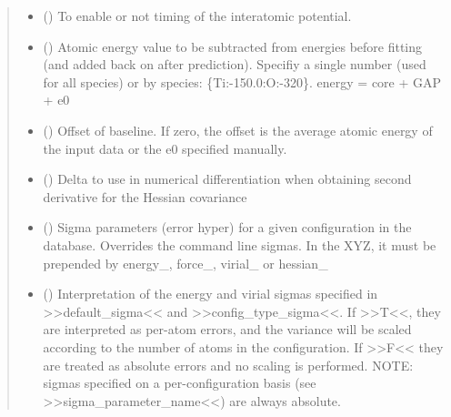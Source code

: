 \documentclass[letterpaper,10pt,english]{sphinxmanual}
\begin{document}
\begin{fulllineitems}
\begin{quote}
\begin{description}
\begin{itemize}
\item {} 
 () \textendash{} To enable or not timing of the interatomic potential.

\item {} 
 () \textendash{} Atomic energy value to be subtracted from energies before fitting (and added back on after
prediction). Specifiy a single number (used for all species) or by species: \{Ti:-150.0:O:-320\}.
energy = core + GAP + e0

\item {} 
 () \textendash{} Offset of baseline. If zero, the offset is the average atomic energy of the input data or
the e0 specified manually.

\item {} 
 () \textendash{} Delta to use in numerical differentiation when obtaining second derivative for the
Hessian covariance

\item {} 
 () \textendash{} Sigma parameters (error hyper) for a given configuration in the database. Overrides
the command line sigmas. In the XYZ, it must be prepended by energy\_, force\_, virial\_ or hessian\_

\item {} 
 () \textendash{} Interpretation of the energy and virial sigmas specified in \textgreater{}\textgreater{}default\_sigma\textless{}\textless{} and
\textgreater{}\textgreater{}config\_type\_sigma\textless{}\textless{}. If \textgreater{}\textgreater{}T\textless{}\textless{}, they are interpreted as per-atom errors, and the variance will be scaled
according to the number of atoms in the configuration. If \textgreater{}\textgreater{}F\textless{}\textless{} they are treated as absolute errors and no
scaling is performed. NOTE: sigmas specified on a per-configuration basis (see \textgreater{}\textgreater{}sigma\_parameter\_name\textless{}\textless{})
are always absolute.


\end{itemize}
\end{description}
\end{quote}
\end{fulllineitems}
\end{document}
